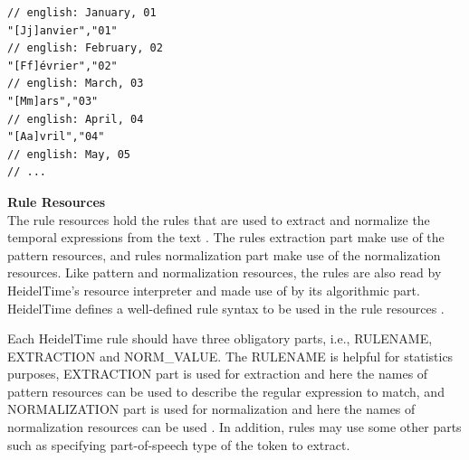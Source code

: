 

\begin{minipage}{\linewidth}
\begin{lstlisting}
// english: January, 01
"[Jj]anvier","01"
// english: February, 02
"[Ff]évrier","02"
// english: March, 03
"[Mm]ars","03"
// english: April, 04
"[Aa]vril","04"
// english: May, 05
// ...
\end{lstlisting}
\end{minipage}




\textbf{Rule Resources}\\
The rule resources hold the rules that are used to extract and normalize the temporal expressions from the text \cite{DBLP:phd/de/Strotgen15}. The rules extraction part make use of the pattern resources, and rules normalization part make use of the normalization resources. Like pattern and normalization resources, the rules are also read by HeidelTime's resource interpreter and made use of by its algorithmic part. HeidelTime defines a well-defined rule syntax to be used in the rule resources \cite{DBLP:phd/de/Strotgen15}. 

Each HeidelTime rule should have three obligatory parts, i.e., RULENAME, EXTRACTION and NORM\_VALUE. The RULENAME is helpful for statistics purposes, EXTRACTION part is used for extraction and here the names of pattern resources can be used to describe the regular expression to match, and NORMALIZATION part is used for normalization and here the names of normalization resources can be used \cite{DBLP:phd/de/Strotgen15}. In addition, rules may use some other parts such as specifying part-of-speech type of the token to extract. 

